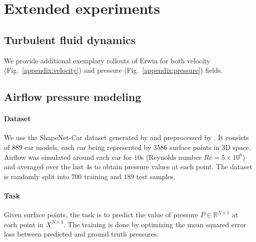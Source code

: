 \section{Extended experiments}
\label{appendix:additional_experiments}
\subsection{Turbulent fluid dynamics} 
We provide additional exemplary rollouts of Erwin for both velocity  (Fig.~\ref{appendix:velocity}) and pressure (Fig.~\ref{appendix:pressure}) fields.

\subsection{Airflow pressure modeling}

\paragraph{Dataset}
We use the ShapeNet-Car dataset generated by \citet{Umetani2018LearningTF} and preprocessed by \citet{alkin2024upt}. It consists of $889$ car models, each car being represented by $3586$ surface points in $3$D space. Airflow was simulated around each car for $10$s (Reynolds number $Re = 5 \times 10^6$) and averaged over the last $4$s to obtain pressure values at each point. The dataset is randomly split into $700$ training and $189$ test samples.

\vspace{-7pt}
\paragraph{Task}
Given surface points, the task is to predict the value of pressure $P \in \mathbb{R}^{N \times 1}$ at each point in $X^{N \times 3}$. The training is done by optimizing the mean squared error loss between predicted and ground truth pressures.



\vspace{-7pt}
